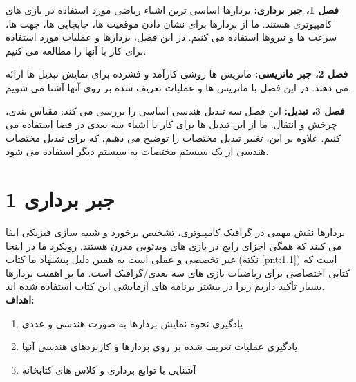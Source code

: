{\begin{spacing}{1.4}
        \textbf{فصل 1، جبر برداری:} بردارها اساسی ترین اشیاء ریاضی مورد استفاده در بازی های کامپیوتری هستند.
        ما از بردارها برای نشان دادن موقعیت ها، جابجایی ها، جهت ها، سرعت ها و نیروها استفاده می کنیم.
        در این فصل، بردارها و عملیات مورد استفاده برای کار با آنها را مطالعه می کنیم.

        \textbf{فصل 2، جبر ماتریسی:} ماتریس ها روشی کارآمد و فشرده برای نمایش تبدیل ها ارائه می دهند.
        در این فصل با ماتریس ها و عملیات تعریف شده بر روی آنها آشنا می شویم.

        \textbf{فصل 3، تبدیل:} این فصل سه تبدیل هندسی اساسی را بررسی می کند: مقیاس بندی، چرخش و انتقال.
        ما از این تبدیل ها برای کار با اشیاء سه بعدی در فضا استفاده می کنیم.
        علاوه بر این، تغییر تبدیل مختصات را توضیح می دهیم، که برای تبدیل مختصات هندسی از یک سیستم مختصات به سیستم دیگر استفاده می شود.
    \end{spacing}
}

\setcounter{chapter}{1}

\textbf{\vspace{80pt}}

\chapter{\textbf{1 جبر برداری}}
\textbf{\vspace{70pt}}
{
    \Large
    \begin{spacing}{1.5}
        بردارها نقش مهمی در گرافیک کامپیوتری، تشخیص برخورد و شبیه سازی فیزیکی ایفا می کنند که همگی اجزای رایج در بازی های ویدئویی مدرن هستند.
        رویکرد ما در اینجا غیر تخصصی و عملی است به همین دلیل پیشنهاد ما کتاب  (نکته \ref{pnt:1.1}) است که کتابی اختصاصی برای ریاضیات بازی های سه بعدی/گرافیک است.
        ما بر اهمیت بردارها بسیار تأکید داریم زیرا در بیشتر برنامه های آزمایشی این کتاب استفاده شده اند.
        \\

        \textbf{\LARGE \hspace{-40pt}اهداف:}
        \begin{enumerate}[label=\textbf{\arabic*}.]
            \item {یادگیری نحوه نمایش بردارها به صورت هندسی و عددی}
            \item {یادگیری عملیات تعریف شده بر روی بردارها و کاربردهای هندسی آنها}
            \item {آشنایی با توابع برداری و کلاس های کتابخانه }
        \end{enumerate}
    \end{spacing}
}
\newpage

